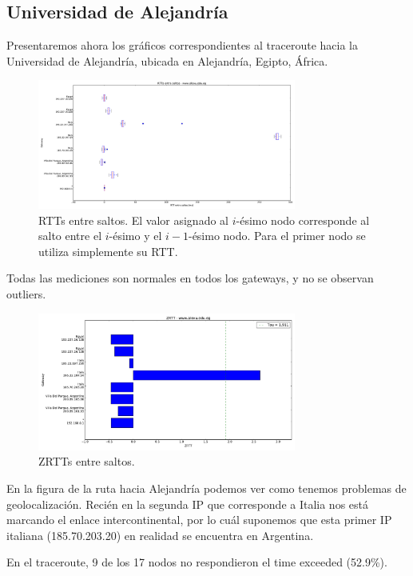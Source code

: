 \subsection{Universidad de Alejandría}

Presentaremos ahora los gráficos correspondientes al traceroute hacia la Universidad de Alejandría, ubicada en Alejandría, Egipto, África.

\begin{figure}[H]
    \centering
    \includegraphics[width=8.5cm]{img/grafico1-www-alexu-edu-eg.pdf}
    \caption{\normalfont RTTs entre saltos. El valor asignado al $i$-ésimo nodo corresponde al salto entre el $i$-ésimo y el $i - 1$-ésimo nodo. Para el primer nodo se utiliza simplemente su RTT.}
\end{figure}

Todas las mediciones son normales en todos los gateways, y no se observan outliers. 

\begin{figure}[H]
    \centering
    \includegraphics[width=8.5cm]{img/grafico2-www-alexu-edu-eg.pdf}
    \caption{\normalfont ZRTTs entre saltos.}
\end{figure}

En la figura de la ruta hacia Alejandría podemos ver como tenemos problemas de geolocalización. Recién en la segunda IP que corresponde 
a Italia nos está marcando el enlace intercontinental, por lo cuál suponemos que esta primer IP italiana (185.70.203.20) en realidad
se encuentra en Argentina. 

En el traceroute, 9 de los 17 nodos no respondieron el time exceeded (52.9\%).



